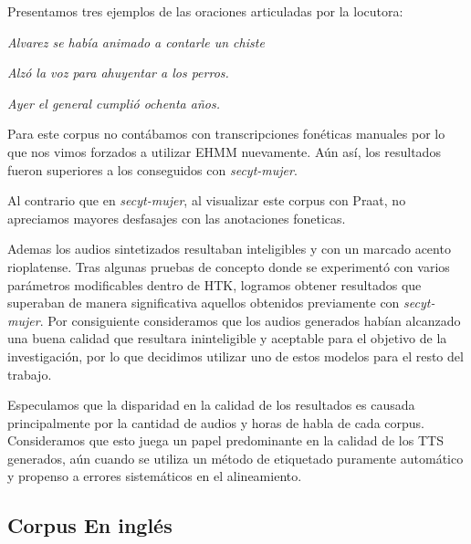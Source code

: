Presentamos tres ejemplos de las oraciones articuladas por la locutora:

\indent\indent \textit{Alvarez se había animado a contarle un chiste}

\indent\indent \textit{Alzó la voz para ahuyentar a los perros.}

\indent\indent \textit{Ayer el general cumplió ochenta años.}

\aclararMismasConjuntosConOverlaping

Para este corpus no contábamos con transcripciones fonéticas manuales por lo que nos vimos forzados a utilizar EHMM nuevamente. Aún así, los resultados fueron superiores a los conseguidos con \textit{secyt-mujer}. 

Al contrario que en \textit{secyt-mujer}, al visualizar este corpus con Praat, no apreciamos mayores desfasajes con las anotaciones foneticas.

Ademas los audios sintetizados resultaban inteligibles y con un marcado acento rioplatense. Tras algunas pruebas de concepto donde se experimentó con varios parámetros modificables dentro de HTK, logramos obtener resultados que superaban de manera significativa aquellos obtenidos previamente con \textit{secyt-mujer}. Por consiguiente consideramos que los audios generados habían alcanzado una buena calidad que resultara ininteligible y aceptable para el objetivo de la investigación, por lo que decidimos utilizar uno de estos modelos para el resto del trabajo.


Especulamos que la disparidad en la calidad de los resultados es causada principalmente por la cantidad de audios y horas de habla de cada corpus\cite{whyItSucked}. Consideramos que esto juega un papel predominante en la calidad de los TTS generados, aún cuando se utiliza un método de etiquetado puramente automático y propenso a errores sistemáticos en el alineamiento.


\subsection{Corpus En inglés}

